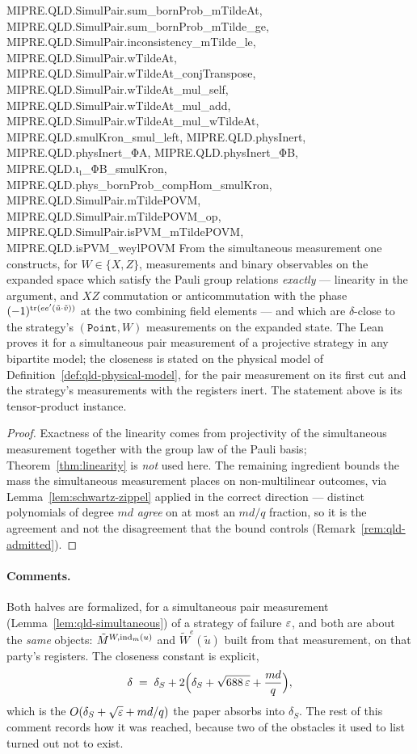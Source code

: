 \begin{lemma}
{  MIPRE.QLD.SimulPair.sum_bornProb_mTildeAt, MIPRE.QLD.SimulPair.sum_bornProb_mTilde_ge,
  MIPRE.QLD.SimulPair.inconsistency_mTilde_le, MIPRE.QLD.SimulPair.wTildeAt,
  MIPRE.QLD.SimulPair.wTildeAt_conjTranspose, MIPRE.QLD.SimulPair.wTildeAt_mul_self,
  MIPRE.QLD.SimulPair.wTildeAt_mul_add, MIPRE.QLD.SimulPair.wTildeAt_mul_wTildeAt,
  MIPRE.QLD.smulKron_smul_left, MIPRE.QLD.physInert, MIPRE.QLD.physInert_ΦA, MIPRE.QLD.physInert_ΦB,
  MIPRE.QLD.ι₁_ΦB_smulKron, MIPRE.QLD.phys_bornProb_compHom_smulKron,
  MIPRE.QLD.SimulPair.mTildePOVM, MIPRE.QLD.SimulPair.mTildePOVM_op,
  MIPRE.QLD.SimulPair.isPVM_mTildePOVM, MIPRE.QLD.isPVM_weylPOVM}
\leanok
From the simultaneous measurement one constructs, for $W \in \{X, Z\}$, measurements and
binary observables on the expanded space which satisfy the Pauli group relations
\emph{exactly} --- linearity in the argument, and $XZ$ commutation or anticommutation with the
phase $(-1)^{\operatorname{tr}(e e' (\tilde{u} \cdot \tilde{v}))}$ at the two combining field elements ---
and which are $\delta$-close to the strategy's $(\mathtt{Point}, W)$ measurements on the expanded
state. The Lean proves it for a simultaneous pair measurement of a projective strategy in any
bipartite model; the closeness is stated on the physical model of
Definition~\ref{def:qld-physical-model}, for the pair measurement on its first cut and the
strategy's measurements with the registers inert. The statement above is its tensor-product
instance.
\end{lemma}

\begin{proof}
\leanok
Exactness of the linearity comes from projectivity of the simultaneous measurement together
with the group law of the Pauli basis; Theorem~\ref{thm:linearity} is \emph{not} used here.
The remaining ingredient bounds the mass the simultaneous measurement places on
non-multilinear outcomes, via Lemma~\ref{lem:schwartz-zippel} applied in the correct
direction --- distinct polynomials of degree $md$ \emph{agree} on at most an $md/q$ fraction,
so it is the agreement and not the disagreement that the bound controls
(Remark~\ref{rem:qld-admitted}).
\end{proof}

\paragraph{Comments.} Both halves are formalized, for a simultaneous pair measurement
(Lemma~\ref{lem:qld-simultaneous}) of a strategy of failure $\varepsilon$, and both are about the
\emph{same} objects: $\tilde{M}^{W,\mathrm{ind}_m(u)}$ and $\tilde{W}^e(\tilde{u})$ built from that
measurement, on that party's registers. The closeness constant is explicit,
\begin{equation*}
  \delta \;=\; \delta_S + 2\Bigl( \delta_S + \sqrt{688\,\varepsilon} + \frac{md}{q} \Bigr) ,
\end{equation*}
which is the $O(\delta_S + \sqrt{\varepsilon} + md/q)$ the paper absorbs into $\delta_S$. The rest of
this comment records how it was reached, because two of the obstacles it used to list turned out
not to exist.

